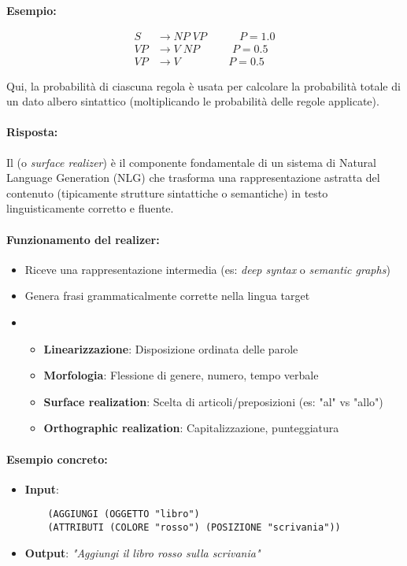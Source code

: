 \medskip
\noindent
\textbf{Esempio:}

\begin{align*}
S &\rightarrow NP\;VP \quad\quad\quad P = 1.0 \\
VP &\rightarrow V\;NP \quad\quad\quad P = 0.5 \\
VP &\rightarrow V \quad\quad\quad\;\;\;\;\; P = 0.5
\end{align*}

\noindent
Qui, la probabilità di ciascuna regola è usata per calcolare la probabilità totale di un dato albero sintattico (moltiplicando le probabilità delle regole applicate).



\paragraph{Risposta:} Il  (o \textit{surface realizer}) è il componente fondamentale di un sistema di Natural Language Generation (NLG) che trasforma una rappresentazione astratta del contenuto (tipicamente strutture sintattiche o semantiche) in testo linguisticamente corretto e fluente. 

\paragraph{Funzionamento del realizer:}
\begin{itemize}
  \item {} Riceve una rappresentazione intermedia (es: \textit{deep syntax} o \textit{semantic graphs})
  \item {} Genera frasi grammaticalmente corrette nella lingua target
  \item {}
  \begin{itemize}
    \item \textbf{Linearizzazione}: Disposizione ordinata delle parole
    \item \textbf{Morfologia}: Flessione di genere, numero, tempo verbale
    \item \textbf{Surface realization}: Scelta di articoli/preposizioni (es: "al" vs "allo")
    \item \textbf{Orthographic realization}: Capitalizzazione, punteggiatura
  \end{itemize}
\end{itemize}

\paragraph{Esempio concreto:}
\begin{itemize}
  \item \textbf{Input}: 
  \begin{verbatim}
    (AGGIUNGI (OGGETTO "libro") 
    (ATTRIBUTI (COLORE "rosso") (POSIZIONE "scrivania"))
  \end{verbatim}
  \item \textbf{Output}: \textit{"Aggiungi il libro rosso sulla scrivania"}
\end{itemize}

